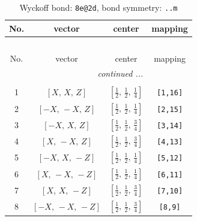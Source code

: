 \documentclass[fleqn,8pt]{jsarticle}
\begin{document}
\begin{longtable}{cccc}
\caption{Wyckoff bond: {\tt 8e@2d}, bond symmetry: {\tt ..m}}
 \\
 \hline \hline
No. & vector & center & mapping \\ \hline \endfirsthead

\multicolumn{3}{l}{\tablename\ \thetable{}} \\
 \hline \hline
No. & vector & center & mapping \\ \hline \endhead

 \hline \hline
\multicolumn{3}{r}{\footnotesize\it continued ...} \\ \endfoot

 \hline \hline
\multicolumn{3}{r}{} \\ \endlastfoot

1 & $\left[ X,\, X,\, Z \right]$ & $\left[ \frac{1}{2},\, \frac{1}{2},\, \frac{1}{4} \right]$ & {\tt [1,16]} \\ \hline
2 & $\left[ - X,\, - X,\, Z \right]$ & $\left[ \frac{1}{2},\, \frac{1}{2},\, \frac{1}{4} \right]$ & {\tt [2,15]} \\ \hline
3 & $\left[ - X,\, X,\, Z \right]$ & $\left[ \frac{1}{2},\, \frac{1}{2},\, \frac{3}{4} \right]$ & {\tt [3,14]} \\ \hline
4 & $\left[ X,\, - X,\, Z \right]$ & $\left[ \frac{1}{2},\, \frac{1}{2},\, \frac{3}{4} \right]$ & {\tt [4,13]} \\ \hline
5 & $\left[ - X,\, X,\, - Z \right]$ & $\left[ \frac{1}{2},\, \frac{1}{2},\, \frac{1}{4} \right]$ & {\tt [5,12]} \\ \hline
6 & $\left[ X,\, - X,\, - Z \right]$ & $\left[ \frac{1}{2},\, \frac{1}{2},\, \frac{1}{4} \right]$ & {\tt [6,11]} \\ \hline
7 & $\left[ X,\, X,\, - Z \right]$ & $\left[ \frac{1}{2},\, \frac{1}{2},\, \frac{3}{4} \right]$ & {\tt [7,10]} \\ \hline
8 & $\left[ - X,\, - X,\, - Z \right]$ & $\left[ \frac{1}{2},\, \frac{1}{2},\, \frac{3}{4} \right]$ & {\tt [8,9]} \\
\end{longtable}
\renewcommand{\arraystretch}{1.2}
\end{document}
